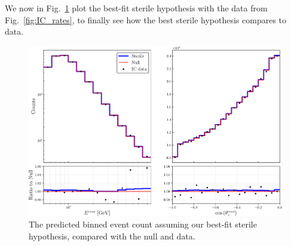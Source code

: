 
We now in Fig.~\ref{fig:final_rate_plot} plot the best-fit sterile hypothesis with the data from Fig.~\ref{fig:IC_rates}, to finally see how the best 
sterile hypothesis compares to data.
\begin{figure}
    \centering
    \includegraphics[width=1\textwidth]{figures/final_rate_plot.pdf}
    \caption{The predicted binned event count assuming our best-fit sterile hypothesis, compared with the 
    null and data.}\label{fig:final_rate_plot}
\end{figure}
%